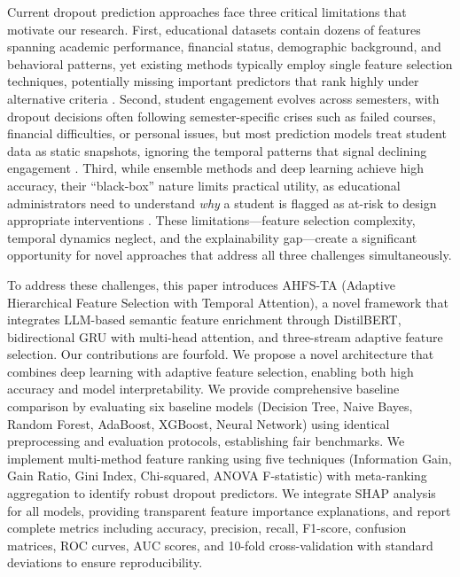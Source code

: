 \documentclass[journal]{IEEEtran}
\begin{document}
Current dropout prediction approaches face three critical limitations that motivate our research. First, educational datasets contain dozens of features spanning academic performance, financial status, demographic background, and behavioral patterns, yet existing methods typically employ single feature selection techniques, potentially missing important predictors that rank highly under alternative criteria \cite{malik2025advancing}. Second, student engagement evolves across semesters, with dropout decisions often following semester-specific crises such as failed courses, financial difficulties, or personal issues, but most prediction models treat student data as static snapshots, ignoring the temporal patterns that signal declining engagement \cite{tan2025student}. Third, while ensemble methods and deep learning achieve high accuracy, their ``black-box'' nature limits practical utility, as educational administrators need to understand \textit{why} a student is flagged as at-risk to design appropriate interventions \cite{castro2025predictive,zhang2025machine,lopez2025ai}. These limitations---feature selection complexity, temporal dynamics neglect, and the explainability gap---create a significant opportunity for novel approaches that address all three challenges simultaneously.

To address these challenges, this paper introduces AHFS-TA (Adaptive Hierarchical Feature Selection with Temporal Attention), a novel framework that integrates LLM-based semantic feature enrichment through DistilBERT, bidirectional GRU with multi-head attention, and three-stream adaptive feature selection. Our contributions are fourfold. We propose a novel architecture that combines deep learning with adaptive feature selection, enabling both high accuracy and model interpretability. We provide comprehensive baseline comparison by evaluating six baseline models (Decision Tree, Naive Bayes, Random Forest, AdaBoost, XGBoost, Neural Network) using identical preprocessing and evaluation protocols, establishing fair benchmarks. We implement multi-method feature ranking using five techniques (Information Gain, Gain Ratio, Gini Index, Chi-squared, ANOVA F-statistic) with meta-ranking aggregation to identify robust dropout predictors. We integrate SHAP analysis for all models, providing transparent feature importance explanations, and report complete metrics including accuracy, precision, recall, F1-score, confusion matrices, ROC curves, AUC scores, and 10-fold cross-validation with standard deviations to ensure reproducibility.
\end{document}
